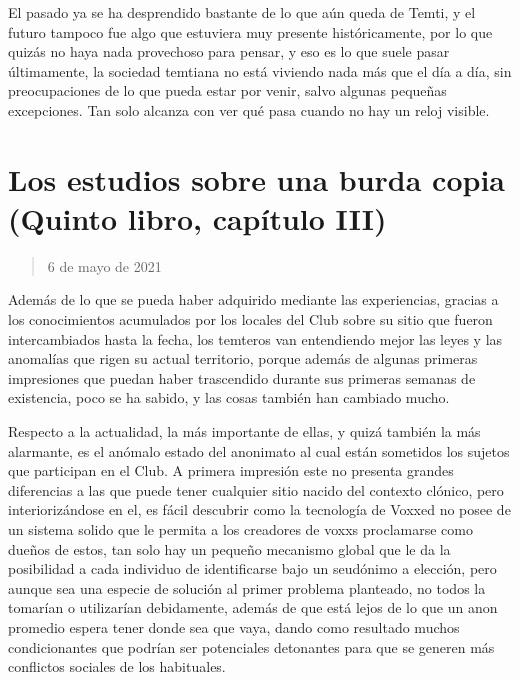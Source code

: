 \documentclass[
]{book}
\begin{document}
El pasado ya se ha desprendido bastante de lo que aún queda de Temti, y el futuro tampoco fue algo que estuviera muy presente históricamente, por lo que quizás no haya nada provechoso para pensar, y eso es lo que suele pasar últimamente, la sociedad temtiana no está viviendo nada más que el día a día, sin preocupaciones de lo que pueda estar por venir, salvo algunas pequeñas excepciones. Tan solo alcanza con ver qué pasa cuando no hay un reloj visible.

\hypertarget{los-estudios-sobre-una-burda-copia-quinto-libro-capuxedtulo-iii}{%
\section{Los estudios sobre una burda copia (Quinto libro, capítulo III)}\label{los-estudios-sobre-una-burda-copia-quinto-libro-capuxedtulo-iii}}

\begin{quote}
6 de mayo de 2021
\end{quote}

Además de lo que se pueda haber adquirido mediante las experiencias, gracias a los conocimientos acumulados por los locales del Club sobre su sitio que fueron intercambiados hasta la fecha, los temteros van entendiendo mejor las leyes y las anomalías que rigen su actual territorio, porque además de algunas primeras impresiones que puedan haber trascendido durante sus primeras semanas de existencia, poco se ha sabido, y las cosas también han cambiado mucho.

Respecto a la actualidad, la más importante de ellas, y quizá también la más alarmante, es el anómalo estado del anonimato al cual están sometidos los sujetos que participan en el Club. A primera impresión este no presenta grandes diferencias a las que puede tener cualquier sitio nacido del contexto clónico, pero interiorizándose en el, es fácil descubrir como la tecnología de Voxxed no posee de un sistema solido que le permita a los creadores de voxxs proclamarse como dueños de estos, tan solo hay un pequeño mecanismo global que le da la posibilidad a cada individuo de identificarse bajo un seudónimo a elección, pero aunque sea una especie de solución al primer problema planteado, no todos la tomarían o utilizarían debidamente, además de que está lejos de lo que un anon promedio espera tener donde sea que vaya, dando como resultado muchos condicionantes que podrían ser potenciales detonantes para que se generen más conflictos sociales de los habituales.
\end{document}
